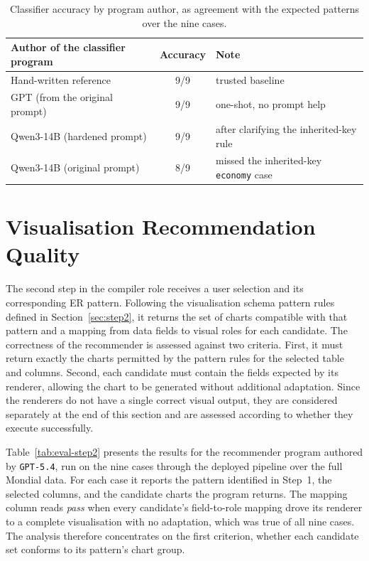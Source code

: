 \begin{table}[htbp]
\centering
\caption{Classifier accuracy by program author, as agreement with the expected patterns over the nine cases.}
\label{tab:eval-step1-authors}
\small
\begin{tabular}{@{}lc l@{}}
\toprule
\textbf{Author of the classifier program} & \textbf{Accuracy} & \textbf{Note} \\
\midrule
Hand-written reference & 9/9 & trusted baseline \\
GPT (from the original prompt) & 9/9 & one-shot, no prompt help \\
Qwen3-14B (hardened prompt) & 9/9 & after clarifying the inherited-key rule \\
Qwen3-14B (original prompt) & 8/9 & missed the inherited-key \texttt{economy} case \\
\bottomrule
\end{tabular}
\end{table}

\section{Visualisation Recommendation Quality}
\label{sec:eval-step2}

The second step in the compiler role receives a user selection and its corresponding ER pattern. Following the visualisation schema pattern rules defined in Section~\ref{sec:step2}, it returns the set of charts compatible with that pattern and a mapping from data fields to visual roles for each candidate. The correctness of the recommender is assessed against two criteria. First, it must return exactly the charts permitted by the pattern rules for the selected table and columns. Second, each candidate must contain the fields expected by its renderer, allowing the chart to be generated without additional adaptation. Since the renderers do not have a single correct visual output, they are considered separately at the end of this section and are assessed according to whether they execute successfully.

Table~\ref{tab:eval-step2} presents the results for the recommender program authored by \texttt{GPT-5.4}, run on the nine cases through the deployed pipeline over the full Mondial data. For each case it reports the pattern identified in Step~1, the selected columns, and the candidate charts the program returns. The mapping column reads \emph{pass} when every candidate's field-to-role mapping drove its renderer to a complete visualisation with no adaptation, which was true of all nine cases. The analysis therefore concentrates on the first criterion, whether each candidate set conforms to its pattern's chart group.

